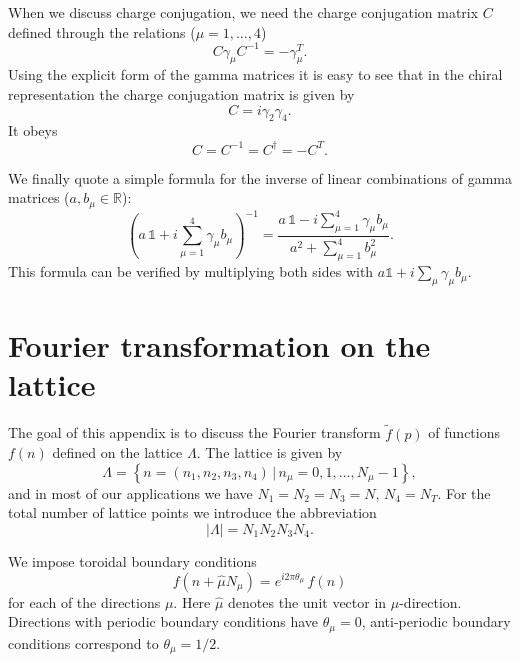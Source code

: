 When we discuss charge conjugation, we need the charge conjugation matrix $C$
defined through the relations ($\mu = 1, \ldots, 4$)
\begin{equation}
  C\gamma_\mu C^{-1} = -\gamma_\mu^T .
\end{equation}
Using the explicit form of the gamma matrices it is easy to see that in the
chiral representation the charge conjugation matrix is given by
\begin{equation}
  C = i\gamma_2\gamma_4 .
\end{equation}
It obeys
\begin{equation}
  C = C^{-1} = C^\dagger = -C^T .
\end{equation}

We finally quote a simple formula for the inverse of linear combinations of
gamma matrices ($a, b_\mu \in \mathbb{R}$):
\begin{equation}
  \left( a\,\mathbb{1} + i\sum_{\mu=1}^{4}\gamma_\mu b_\mu \right)^{-1}
  = \frac{ a\,\mathbb{1} - i\sum_{\mu=1}^{4}\gamma_\mu b_\mu }{ a^2 + \sum_{\mu=1}^{4}b_\mu^2 }.
\end{equation}
This formula can be verified by multiplying both sides with
$a\mathbb{1} + i\sum_\mu \gamma_\mu b_\mu$.

\section{Fourier transformation on the lattice}

The goal of this appendix is to discuss the Fourier transform $\tilde{f}(p)$
of functions $f(n)$ defined on the lattice $\Lambda$. The lattice is given by
\begin{equation}
  \Lambda = \left\{ n = (n_1, n_2, n_3, n_4) \,\big|\, n_\mu = 0, 1, \ldots, N_\mu - 1 \right\},
\end{equation}
and in most of our applications we have $N_1 = N_2 = N_3 = N$, $N_4 = N_T$.
For the total number of lattice points we introduce the abbreviation
\begin{equation}
  |\Lambda| = N_1 N_2 N_3 N_4 .
\end{equation}

We impose toroidal boundary conditions
\begin{equation}
  f(n + \hat{\mu}N_\mu) = e^{i 2\pi\theta_\mu}\, f(n)
\end{equation}
for each of the directions $\mu$. Here $\hat{\mu}$ denotes the unit vector in
$\mu$-direction. Directions with periodic boundary conditions have
$\theta_\mu = 0$, anti-periodic boundary conditions correspond to
$\theta_\mu = 1/2$.

